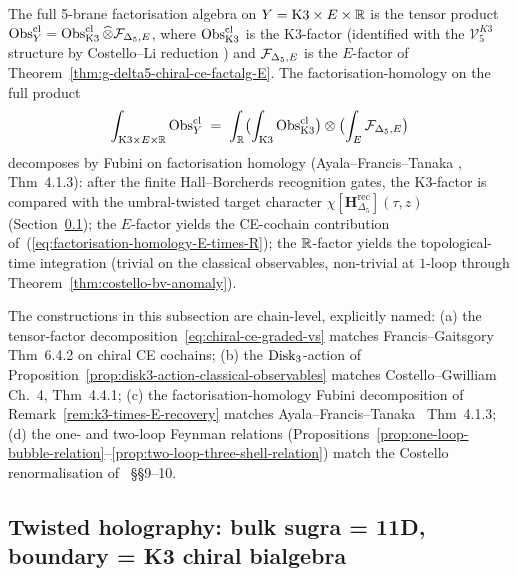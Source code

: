 \begin{remark}
\label{rem:k3-times-E-recovery}
The full 5-brane factorisation algebra on $Y = \mathrm{K3}\times
E\times\mathbb R$ is the tensor product
$\mathrm{Obs}^{\mathrm{cl}}_Y = \operatorname{Obs}^{\mathrm{cl}}_{\mathrm{K3}}
\widehat\otimes \mathcal F_{\Delta_5,E}$, where $\operatorname{Obs}^{\mathrm{cl}}_{\mathrm{K3}}$ is
the K3-factor (identified with the $\mathcal V^{K3}_5$ structure by
Costello--Li reduction \cite{CL16}) and $\mathcal F_{\Delta_5,E}$ is the
$E$-factor of Theorem~\ref{thm:g-delta5-chiral-ce-factalg-E}. The
factorisation-homology on the full product
\begin{equation}
\int_{\mathrm{K3}\times E\times\mathbb R}\operatorname{Obs}^{\mathrm{cl}}_Y
\;=\;
\int_\mathbb R\bigl(
\int_{\mathrm{K3}}\operatorname{Obs}^{\mathrm{cl}}_{\mathrm{K3}}\bigr)
\otimes\bigl(\int_E\mathcal F_{\Delta_5,E}\bigr)
\end{equation}
decomposes by Fubini on factorisation homology (Ayala--Francis--Tanaka
\cite{AyalaFrancisTanaka2017}, Thm~4.1.3): after the finite
Hall--Borcherds recognition gates, the K3-factor is compared with the
umbral-twisted target character
$\chi[\mathbf H_{\Delta_5}^{\mathrm{rec}}](\tau,z)$
(Section~\ref{subsec:costello-twisted-holography}); the $E$-factor
yields the CE-cochain contribution of~(\ref{eq:factorisation-homology-E-times-R});
the $\mathbb R$-factor yields the topological-time integration (trivial on
the classical observables, non-trivial at $1$-loop through
Theorem~\ref{thm:costello-bv-anomaly}).
\end{remark}

\begin{remark}
\label{rem:e3-chiral-ce-primary-lit}
The constructions in this subsection are chain-level, explicitly named:
(a) the tensor-factor decomposition~\eqref{eq:chiral-ce-graded-vs}
matches Francis--Gaitsgory~\cite{FrancisGaitsgory2012}
Thm~6.4.2 on chiral CE cochains;
(b) the $\mathrm{Disk}_3$-action of
Proposition~\ref{prop:disk3-action-classical-observables}
matches Costello--Gwilliam~\cite{CG17} Ch.~4, Thm~4.4.1;
(c) the factorisation-homology Fubini decomposition of
Remark~\ref{rem:k3-times-E-recovery}
matches Ayala--Francis--Tanaka~\cite{AyalaFrancisTanaka2017} Thm~4.1.3;
(d) the one- and two-loop Feynman relations
(Propositions~\ref{prop:one-loop-bubble-relation}--\ref{prop:two-loop-three-shell-relation})
match the Costello renormalisation
of~\cite{Costello2011} \S\S9--10.
\end{remark}

\subsection{Twisted holography: bulk sugra = 11D, boundary = K3
chiral bialgebra}
\label{subsec:costello-twisted-holography}

